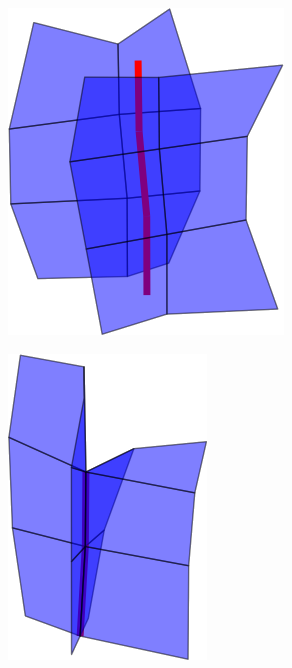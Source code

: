 \begin{figure}
\begin{center}
\begin{subfigure}[b]{.45\textwidth}
\includegraphics[height = .17\textheight, width = .5\textwidth,keepaspectratio]{Pictures/SurfaceReconstruction/3DManifoldMMRes}
\end{subfigure}
\begin{subfigure}[b]{.45\textwidth}
\centering
\includegraphics[height = .17\textheight, width = .5\textwidth,keepaspectratio]{Pictures/SurfaceReconstruction/3DManifoldMI}
\end{subfigure}
\begin{subfigure}[b]{.45\textwidth}
\centering

\end{subfigure}
\end{center}
\end{figure}
